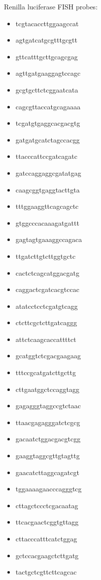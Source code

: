 Renilla luciferase FISH probes:
\begin{itemize}
    \itemsep-0.5em
    \item tcgtacaccttggaagccat
    \item agtgatcatgcgtttgcgtt
    \item gttcatttgcttgcagcgag
    \item agttgatgaaggagtccagc
    \item gcgtgcttctcggaatcata
    \item cagcgttaccatgcagaaaa
    \item tcgatgtgaggcacgacgtg
    \item gatgatgcatctagccacgg
    \item ttacccattccgatcagatc
    \item gatccaggaggcgatatgag
    \item caagcggtgaggtacttgta
    \item tttggaaggttcagcagctc
    \item gtggcccacaaagatgattt
    \item gagtagtgaaaggccagaca
    \item ttgatcttgtcttggtgctc
    \item cactctcagcatggacgatg
    \item caggactcgatcacgtccac
    \item atatcctcctcgatgtcagg
    \item ctcttcgctcttgatcaggg
    \item attctcaagcaccattttct
    \item gcatggtctcgacgaagaag
    \item tttccgcatgatcttgcttg
    \item cttgaatggctccaggtagg
    \item gagagggtaggccgtctaac
    \item ttaacgagagggatctcgcg
    \item gacaatctggacgacgtcgg
    \item gaaggtaggcgttgtagttg
    \item gaacatcttaggcagatcgt
    \item tggaaaagaacccagggtcg
    \item cttagctccctcgacaatag
    \item ttcacgaactcggtgttagg
    \item cttacccatttcatctggag
    \item gctccacgaagctcttgatg
    \item tactgctcgttcttcagcac
\end{itemize}

